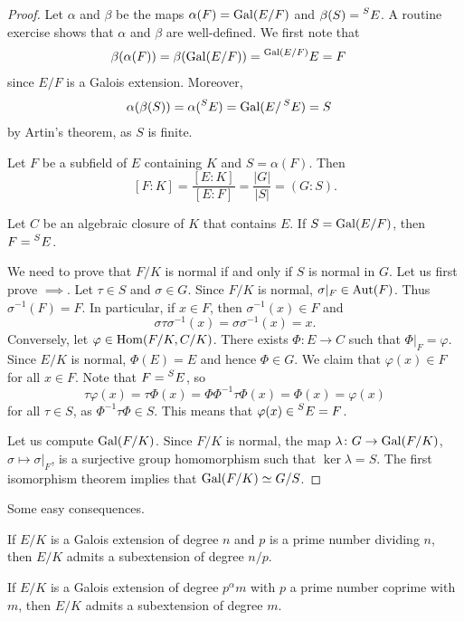 \begin{proof}
Let $\alpha$ and $\beta$ be the maps $\alpha(F)=\operatorname{Gal}(E/F)$ and $\beta(S)=\prescript{S}{}{E}$. A routine
exercise shows that $\alpha$ and $\beta$ are well-defined. 
We first note that
\begin{align*}
   &\beta(\alpha(F))=\beta(\operatorname{Gal}(E/F))=\prescript{\operatorname{Gal}(E/F)}{}{E}=F
\end{align*}
since $E/F$ is a Galois extension. Moreover,
\begin{align*}
   &\alpha(\beta(S))=\alpha(\prescript{S}{}{E})=\operatorname{Gal}(E/\prescript{S}{}{E})=S
\end{align*}
by Artin's theorem, as $S$ is finite. 

Let $F$ be a subfield of $E$ containing $K$ and 
$S=\alpha(F)$. Then
\[
[F:K]=\frac{[E:K]}{[E:F]}=\frac{|G|}{|S|}=(G:S).
\]

Let $C$ be an algebraic closure of $K$ that contains $E$. 
If $S=\operatorname{Gal}(E/F)$, then $F=\prescript{S}{}{E}$. 

We need to prove that $F/K$ is normal if and only if $S$ is normal in $G$. 
Let us first prove $\implies$. Let $\tau\in S$ and $\sigma\in G$. Since
$F/K$ is normal, $\sigma|_F\in\operatorname{Aut}(F)$. Thus $\sigma^{-1}(F)=F$. In particular, 
if $x\in F$, then $\sigma^{-1}(x)\in F$ and 
\[
\sigma\tau\sigma^{-1}(x)=\sigma\sigma^{-1}(x)=x.
\]
Conversely, let $\varphi\in\operatorname{Hom}(F/K,C/K)$. There exists 
$\Phi\colon E\to C$ such that $\Phi|_F=\varphi$. Since $E/K$ is normal, 
$\Phi(E)=E$ and hence $\Phi\in G$. We claim that $\varphi(x)\in F$ for all $x\in F$. 
Note that $F=\prescript{S}{}{E}$, so
 \[
 \tau\varphi(x)=\tau\Phi(x)=\Phi\Phi^{-1}\tau\Phi(x)=\Phi(x)=\varphi(x)
 \]
 for all $\tau\in S$, as $\Phi^{-1}\tau\Phi\in S$. This means that $\varphi(x)\in\prescript{S}{}{E}=F$. 
 
 Let us compute $\operatorname{Gal}(F/K)$. Since $F/K$ is normal, 
 the map 
 $\lambda\colon G\to\operatorname{Gal}(F/K)$, $\sigma\mapsto\sigma|_F$, 
 is a surjective group homomorphism such that $\ker\lambda=S$. The first isomorphism 
 theorem implies that $\operatorname{Gal}(F/K)\simeq G/S$. 
\end{proof}

Some easy consequences.

\begin{exercise}
    If $E/K$ is a Galois extension of degree $n$ and
    $p$ is a prime number dividing $n$, then $E/K$ admits
    a subextension of degree $n/p$. 
\end{exercise}
    
\begin{exercise}
    If $E/K$ is a Galois extension of degree $p^\alpha m$ with
    $p$ a prime number coprime with $m$, then $E/K$ admits 
    a subextension of degree $m$. 
\end{exercise}

